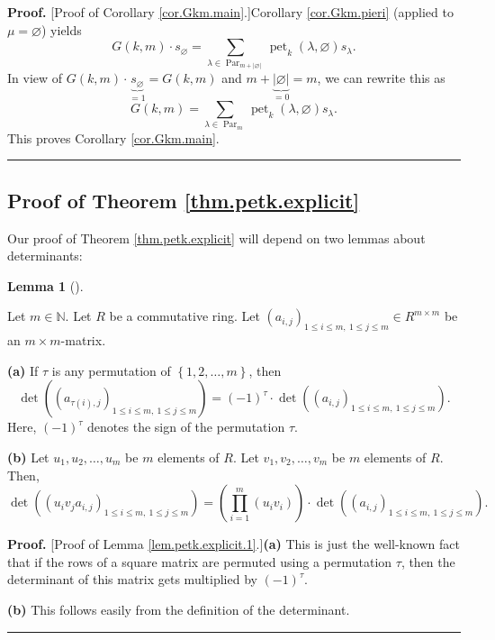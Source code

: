 \documentclass[numbers=enddot,12pt,final,onecolumn,notitlepage]{scrartcl}%
\theoremstyle{definition}
\newtheorem{lem}[theo]{Lemma}
\newenvironment{lemma}[1][]
{\begin{lem}[#1]\begin{leftbar}}
{\end{leftbar}\end{lem}}
\newenvironment{proof}[1][Proof]{\noindent\textbf{#1.} }{\ \rule{0.5em}{0.5em}}
\let\sumnonlimits\sum
\let\prodnonlimits\prod
\renewcommand{\sum}{\sumnonlimits\limits}
\renewcommand{\prod}{\prodnonlimits\limits}
\begin{document}
\begin{proof}
[Proof of Corollary \ref{cor.Gkm.main}.]Corollary \ref{cor.Gkm.pieri} (applied
to $\mu=\varnothing$) yields%
\[
G\left(  k,m\right)  \cdot s_{\varnothing}=\sum_{\lambda\in\operatorname*{Par}%
\nolimits_{m+\left\vert \varnothing\right\vert }}\operatorname*{pet}%
\nolimits_{k}\left(  \lambda,\varnothing\right)  s_{\lambda}.
\]
In view of $G\left(  k,m\right)  \cdot\underbrace{s_{\varnothing}}%
_{=1}=G\left(  k,m\right)  $ and $m+\underbrace{\left\vert \varnothing
\right\vert }_{=0}=m$, we can rewrite this as
\[
G\left(  k,m\right)  =\sum_{\lambda\in\operatorname*{Par}\nolimits_{m}%
}\operatorname*{pet}\nolimits_{k}\left(  \lambda,\varnothing\right)
s_{\lambda}.
\]
This proves Corollary \ref{cor.Gkm.main}.
\end{proof}

\subsection{\label{subsect.proofs.petk.explicit}Proof of Theorem
\ref{thm.petk.explicit}}

Our proof of Theorem \ref{thm.petk.explicit} will depend on two lemmas about determinants:

\begin{lemma}
\label{lem.petk.explicit.1}Let $m\in\mathbb{N}$. Let $R$ be a commutative
ring. Let $\left(  a_{i,j}\right)  _{1\leq i\leq m,\ 1\leq j\leq m}\in
R^{m\times m}$ be an $m\times m$-matrix.

\textbf{(a)} If $\tau$ is any permutation of $\left\{  1,2,\ldots,m\right\}
$, then%
\[
\det\left(  \left(  a_{\tau\left(  i\right)  ,j}\right)  _{1\leq i\leq
m,\ 1\leq j\leq m}\right)  =\left(  -1\right)  ^{\tau}\cdot\det\left(  \left(
a_{i,j}\right)  _{1\leq i\leq m,\ 1\leq j\leq m}\right)  .
\]
Here, $\left(  -1\right)  ^{\tau}$ denotes the sign of the permutation $\tau$.

\textbf{(b)} Let $u_{1},u_{2},\ldots,u_{m}$ be $m$ elements of $R$. Let
$v_{1},v_{2},\ldots,v_{m}$ be $m$ elements of $R$. Then,%
\[
\det\left(  \left(  u_{i}v_{j}a_{i,j}\right)  _{1\leq i\leq m,\ 1\leq j\leq
m}\right)  =\left(  \prod_{i=1}^{m}\left(  u_{i}v_{i}\right)  \right)
\cdot\det\left(  \left(  a_{i,j}\right)  _{1\leq i\leq m,\ 1\leq j\leq
m}\right)  .
\]

\end{lemma}

\begin{proof}
[Proof of Lemma \ref{lem.petk.explicit.1}.]\textbf{(a)} This is just the
well-known fact that if the rows of a square matrix are permuted using a
permutation $\tau$, then the determinant of this matrix gets multiplied by
$\left(  -1\right)  ^{\tau}$.

\textbf{(b)} This follows easily from the definition of the determinant.
\end{proof}
\end{document}
